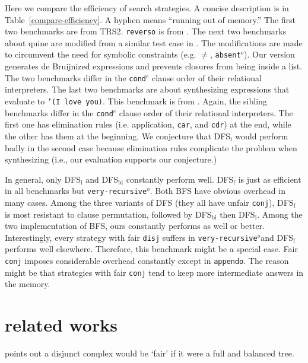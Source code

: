 \documentclass[format=acmlarge, review=true, authordraft=true]{acmart}
\newcommand{\conde}{\texttt{cond$^e$}}
\newcommand{\conj}{\texttt{conj}}
\newcommand{\disj}{\texttt{disj}}
\newcommand{\veryrecursiveo}{\texttt{very-recursive$^o$}}
\newcommand{\DFSi }[0]{DFS$_\textrm{i}$}
\newcommand{\DFSf }[0]{DFS$_\textrm{f}$}
\newcommand{\DFSbi}[0]{DFS$_\textrm{bi}$}
\begin{document}
Here we compare the efficiency of search strategies. A concise 
description is in Table~\ref{compare-efficiency}. A hyphen means ``running out of 
memory.'' The first two benchmarks are from 
TRS2. \texttt{reverso} is from 
\citet{rozplokhas2018improving}. The next two benchmarks 
about quine are modified from a similar test case in \citet{byrd2017unified}. 
The modifications are made 
to circumvent the need for symbolic constraints (e.g. $\neq$, 
\texttt{absent$^o$}). Our version generates de 
Bruijnized expressions and prevents closures from being inside a list. The two 
benchmarks differ in the \conde{} clause order of their relational 
interpreters. 
The last two 
benchmarks are about synthesizing expressions that evaluate to \texttt{'(I love 
you)}. This benchmark is from \citet{byrd2017unified}. Again, the 
sibling benchmarks differ in the \conde{} clause order of their relational 
interpreters. The first one 
has elimination rules (i.e. application, \texttt{car}, and \texttt{cdr}) at the 
end, while the other has them at the beginning. We conjecture that \DFSi{} 
would 
perform badly in the second case because elimination rules complicate the 
problem when synthesizing (i.e., our evaluation supports our conjecture.)


In general, only \DFSi{} and \DFSbi{} constantly perform well. \DFSf{} 
is just as 
efficient in all benchmarks but \veryrecursiveo. Both BFS have obvious 
overhead in many cases. Among the three variants of DFS (they all have unfair 
\conj{}), \DFSf{} is most resistant to clause permutation, followed by 
\DFSbi{} then 
\DFSi{}. Among the two implementation of BFS, ours constantly performs as well 
or 
better. Interestingly, every strategy with fair \disj{} suffers in 
\veryrecursiveo and \DFSf{} performs well elsewhere. 
Therefore, this 
benchmark might be a special case. Fair \conj{} imposes considerable overhead 
constantly except in \texttt{appendo}. The reason might be that strategies with 
fair \conj{} tend to keep more intermediate answers in the memory.

\section{related works}

\citet{yang2010adventures} points out a disjunct complex would be `fair' 
if it were a full and balanced tree.
\end{document}
